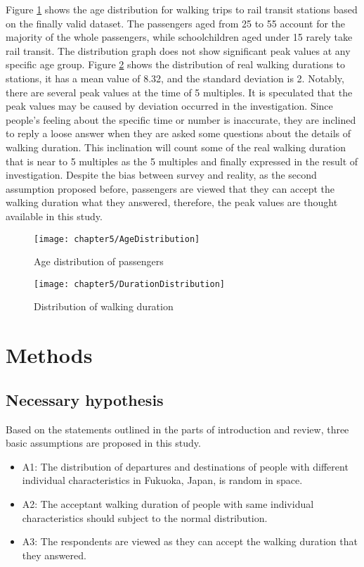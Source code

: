 %
Figure \ref{fig:chp5:AgeDistribution} shows the age distribution for walking trips to rail transit stations based on the finally valid dataset. The passengers aged from 25 to 55 account for the majority of the whole passengers, while schoolchildren aged under 15 rarely take rail transit. The distribution graph does not show significant peak values at any specific age group. Figure \ref{fig:chp5:DurationDistribution} shows the distribution of real walking durations to stations, it has a mean value of 8.32, and the standard deviation is 2. Notably, there are several peak values at the time of 5 multiples. It is speculated that the peak values may be caused by deviation occurred in the investigation. Since people's feeling about the specific time or number is inaccurate, they are inclined to reply a loose answer when they are asked some questions about the details of walking duration. This inclination will count some of the real walking duration that is near to 5 multiples as the 5 multiples and finally expressed in the result of investigation. Despite the bias between survey and reality, as the second assumption proposed before, passengers are viewed that they can accept the walking duration what they answered, therefore, the peak values are thought available in this study.

\begin{figure}[htbp]
	\centering
	\texttt{[image: chapter5/AgeDistribution]}
	\caption{Age distribution of passengers}
	\label{fig:chp5:AgeDistribution}
\end{figure}

\begin{figure}[htbp]
	\centering
	\texttt{[image: chapter5/DurationDistribution]}
	\caption{Distribution of walking duration}
	\label{fig:chp5:DurationDistribution}
\end{figure}

%
\section{Methods}
%
\subsection{Necessary hypothesis}
Based on the statements outlined in the parts of introduction and review, three basic assumptions are proposed in this study.

\begin{itemize}
	\setlength{\parskip}{0\baselineskip} %
	\item A1: The distribution of departures and destinations of people with different individual characteristics in Fukuoka, Japan, is random in space. 
	\item A2: The acceptant walking duration of people with same individual characteristics should subject to the normal distribution. 
	\item A3: The respondents are viewed as they can accept the walking duration that they answered.
	\setlength{\parskip}{0.7\baselineskip} %
\end{itemize}

